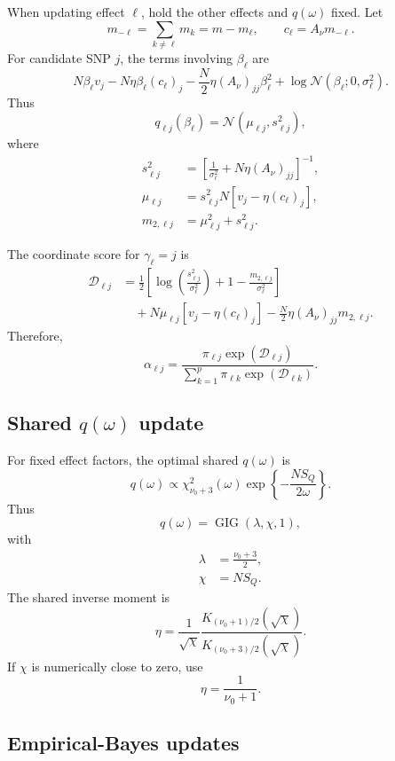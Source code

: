 \documentclass[11pt]{article}
\newcommand{\nuo}{\nu_0}
\newcommand{\Normal}{\mathcal N}
\newcommand{\GIG}{\operatorname{GIG}}
\newcommand{\chisq}{\chi^2}
\begin{document}
When updating effect \(\ell\), hold the other effects and \(q(\omega)\)
fixed. Let
\[
m_{-\ell}
=
\sum_{k\neq\ell}m_k
=
m-m_\ell,
\qquad
c_\ell=A_\nu m_{-\ell}.
\]
For candidate SNP \(j\), the terms involving \(\beta_\ell\) are
\[
N\beta_\ell v_j
-
N\eta\beta_\ell (c_\ell)_j
-
\frac N2\eta (A_\nu)_{jj}\beta_\ell^2
+
\log\Normal(\beta_\ell;0,\sigma_\ell^2).
\]
Thus
\[
q_{\ell j}(\beta_\ell)
=
\Normal(\mu_{\ell j},s_{\ell j}^2),
\]
where
\begin{align}
s_{\ell j}^2
&=
\left[
\frac{1}{\sigma_\ell^2}
+
N\eta (A_\nu)_{jj}
\right]^{-1},
\\
\mu_{\ell j}
&=
s_{\ell j}^2
N
\left[
v_j-\eta(c_\ell)_j
\right],
\\
m_{2,\ell j}
&=
\mu_{\ell j}^2+s_{\ell j}^2.
\end{align}

The coordinate score for \(\gamma_\ell=j\) is
\begin{align}
\mathcal D_{\ell j}
&=
\frac12
\left[
\log\left(\frac{s_{\ell j}^2}{\sigma_\ell^2}\right)
+
1
-
\frac{m_{2,\ell j}}{\sigma_\ell^2}
\right]
\nonumber\\
&\quad
+
N\mu_{\ell j}
\left[
v_j-\eta(c_\ell)_j
\right]
-
\frac N2\eta (A_\nu)_{jj}m_{2,\ell j}.
\end{align}
Therefore,
\[
\alpha_{\ell j}
=
\frac{
\pi_{\ell j}\exp(\mathcal D_{\ell j})
}{
\sum_{k=1}^p
\pi_{\ell k}\exp(\mathcal D_{\ell k})
}.
\]

\subsection*{Shared \(q(\omega)\) update}

For fixed effect factors, the optimal shared \(q(\omega)\) is
\[
q(\omega)
\propto
\chisq_{\nuo+3}(\omega)
\exp\left\{
-
\frac{N S_Q}{2\omega}
\right\}.
\]
Thus
\[
q(\omega)=\GIG(\lambda,\chi,1),
\]
with
\begin{align}
\lambda
&=
\frac{\nuo+3}{2},
\\
\chi
&=
N S_Q.
\end{align}
The shared inverse moment is
\[
\eta
=
\frac{1}{\sqrt{\chi}}
\frac{
K_{(\nuo+1)/2}(\sqrt{\chi})
}{
K_{(\nuo+3)/2}(\sqrt{\chi})
}.
\]
If \(\chi\) is numerically close to zero, use
\[
\eta=\frac{1}{\nuo+1}.
\]

\subsection*{Empirical-Bayes updates}
\end{document}
